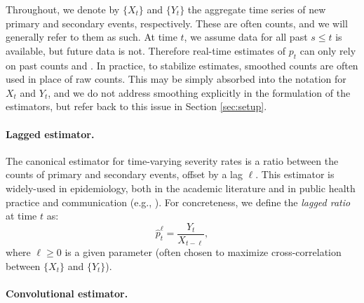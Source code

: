 \documentclass{article}
\renewcommand{\hat}{\widehat} %
\begin{document}
Throughout, we denote by $\{X_t\}$ and $\{Y_t\}$ the aggregate time series of 
new primary and secondary events, respectively. These are often counts, and we
will generally refer to them as such. At time $t$, we assume data for all past
$s \leq t$ is available, but future data is not. Therefore real-time estimates of
$p_t$ can only rely on past counts  and
. In practice, to stabilize estimates, smoothed
counts are often used in place of raw counts. This may be simply absorbed into 
the notation for $X_t$ and $Y_t$, and we do not address smoothing explicitly in
the formulation of the estimators, but refer back to this issue in Section
\ref{sec:setup}.  

\paragraph{Lagged estimator.} 

The canonical estimator for time-varying severity rates is a ratio between
the counts of primary and secondary events, offset by a lag $\ell$. This
estimator is widely-used in epidemiology, both in the academic literature and in 
public health practice and communication (e.g., \citealp{wsj, atlantic,
  yuan2020monitoring, timevar_ifr, thomas2021estimating, horita2022global,
  LIU2023100350, germany}). For concreteness, we define the \emph{lagged ratio} 
at time $t$ as:   
\begin{equation}
\label{eq:lagged}
\hat{p}_t^\ell = \frac{Y_t}{X_{t-\ell}},
\end{equation}
where $\ell \geq 0$ is a given parameter (often chosen to maximize
cross-correlation between $\{X_t\}$ and $\{Y_t\}$).      

\paragraph{Convolutional estimator.} 
\end{document}
